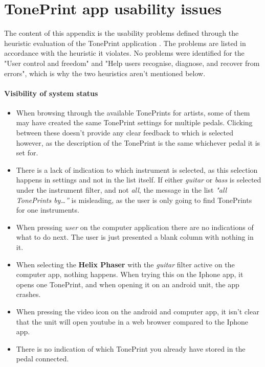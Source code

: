 \chapter{TonePrint app usability issues}
\label{AppendixHeuristics}
The content of this appendix is the usability problems defined through the heuristic evaluation of the TonePrint application . The problems are listed in accordance with the heuristic it violates. No problems were identified for the "User control and freedom" and "Help users recognise, diagnose, and recover from errors", which is why the two heuristics aren't mentioned below.

\subsubsection{Visibility of system status}
\begin{itemize}
	\item When browsing through the available TonePrints for artists, some of them may have created the same TonePrint settings for multiple pedals. Clicking between these doesn’t provide any clear feedback to which is selected however, as the description of the TonePrint is the same whichever pedal it is set for.\\
	\item There is a lack of indication to which instrument is selected, as this selection happens in settings and not in the list itself. If either \textit{guitar} or \textit{bass} is selected under the instrument filter, and not \textit{all}, the message in the list \textit{"all TonePrints by…”} is misleading, as the user is only going to find TonePrints for one instruments.\\
	\item When pressing \textit{user} on the computer application there are no indications of what to do next. The user is just presented a blank column with nothing in it.\\
	\item When selecting the \textbf{Helix Phaser} with the \textit{guitar} filter active on the computer app, nothing happens. When trying this on the Iphone app, it opens one TonePrint, and when opening it on an android unit, the app crashes.\\
	\item When pressing the video icon on the android and computer app, it isn't clear that the unit will open youtube in a web browser compared to the Iphone app.\\
	\item There is no indication of which TonePrint you already have stored in the pedal connected. 
\end{itemize}
%
